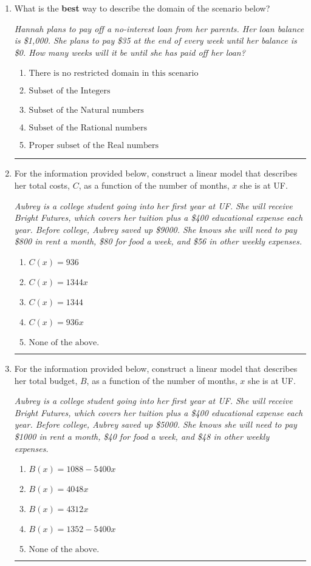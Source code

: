 \documentclass[14pt]{extbook}
\newcommand{\litem}[1]{\item#1\hspace*{-1cm}\rule{\textwidth}{0.4pt}}
\begin{document}
\begin{enumerate}
\litem{
What is the \textbf{best} way to describe the domain of the scenario below?
\begin{center}
    \textit{ Hannah plans to pay off a no-interest loan from her parents. Her loan balance is \$1,000. She plans to pay \$35 at the end of every week until her balance is \$0. How many weeks will it be until she has paid off her loan? }
\end{center}
\begin{enumerate}[label=\Alph*.]
\item \( \text{There is no restricted domain in this scenario} \)
\item \( \text{Subset of the Integers} \)
\item \( \text{Subset of the Natural numbers} \)
\item \( \text{Subset of the Rational numbers} \)
\item \( \text{Proper subset of the Real numbers} \)

\end{enumerate} }
\litem{
For the information provided below, construct a linear model that describes her total costs, $C$, as a function of the number of months, $x$ she is at UF. 
\begin{center}
    \textit{ Aubrey is a college student going into her first year at UF. She will receive Bright Futures, which covers her tuition plus a \$400 educational expense each year. Before college, Aubrey saved up \$9000. She knows she will need to pay \$800 in rent a month, \$80 for food a week, and \$56 in other weekly expenses. }
\end{center}
\begin{enumerate}[label=\Alph*.]
\item \( C(x) = 936 \)
\item \( C(x) = 1344 x \)
\item \( C(x) = 1344 \)
\item \( C(x) = 936 x \)
\item \( \text{None of the above.} \)

\end{enumerate} }
\litem{
For the information provided below, construct a linear model that describes her total budget, $B$, as a function of the number of months, $x$ she is at UF.
\begin{center}
    \textit{ Aubrey is a college student going into her first year at UF. She will receive Bright Futures, which covers her tuition plus a \$400 educational expense each year. Before college, Aubrey saved up \$5000. She knows she will need to pay \$1000 in rent a month, \$40 for food a week, and \$48 in other weekly expenses. }
\end{center}
\begin{enumerate}[label=\Alph*.]
\item \( B(x) = 1088 - 5400 x \)
\item \( B(x) = 4048 x \)
\item \( B(x) = 4312 x \)
\item \( B(x) = 1352 - 5400 x \)
\item \( \text{None of the above.} \)


\end{enumerate}}
\end{enumerate}
\end{document}
